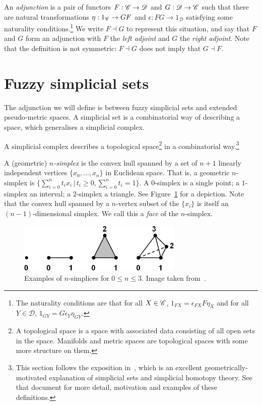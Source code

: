 \documentclass[a4paper,12pt,leqno]{article} \usepackage{amsmath}
\newcommand{\curD}{\mathscr{D}} \newcommand{\curI}{\mathscr{I}}
\theoremstyle{definition}
\begin{document}
An \emph{adjunction} is a pair of functors $F: \curC\to\curD$ and $G:
\curD\to\curC$ such that there are natural transformations $\eta: 1_{\mathscr{C}}\to GF$
and $\epsilon: FG\to 1_\curD$ satisfying some naturality conditions.\footnote{
  The naturality conditions are that for all $X\in\mathscr{C}$, $1_{FX}
  = \epsilon_{FX}F\eta_X$ and for all $Y\in\curD$, $1_{GY}
  = G\epsilon_Y\eta_{GY}$.} We write $F\dashv G$ to represent this situation,
and say that $F$ and $G$ form an adjunction with $F$ the \emph{left adjoint} and
$G$ the \emph{right adjoint}.
Note that the definition is not symmetric:
$F\dashv G$ does not imply that $G\dashv F$.

\section{Fuzzy simplicial sets}
\label{section_fss}

The adjunction we will define is between fuzzy simplicial sets and extended
pseudo-metric spaces.
A simplicial set is a combinatorial way of describing
a space, which generalises a simplicial complex.

A simplicial complex describes a topological space\footnote{ A topological space
is a space with associated data consisting of all open sets in the space.
Manifolds and metric spaces are topological spaces with some more structure on
them.} in a combinatorial way.\footnote{ This section follows the exposition
in~\cite{Friedman08}, which is an excellent geometrically-motivated explanation
of simplicial sets and simplicial homotopy theory.
See that document for more
detail, motivation and examples of these definitions.}

A (geometric) \emph{$n$-simplex} is the convex hull spanned by a set of $n+1$
linearly independent vertices $\{x_0,\dots, x_n\}$ in Euclidean space.
That is,
a geometric $n$-simplex is $\{\sum_{i=0}^n t_ix_i\,|\, t_i\geq 0, \sum_{i=0}^n
t_i = 1\}$.
A $0$-simplex is a single point; a $1$-simplex an interval;
a $2$-simplex a triangle.
See Figure~\ref{fig_simplices} for a depiction.
Note
that the convex hull spanned by a $n$-vertex subset of the $\{x_i\}$ is itself
an $(n-1)$-dimensional simplex.
We call this a \emph{face} of the $n$-simplex.

\begin{figure} \centering
\includegraphics[width=0.7\textwidth]{figures/simp2.jpg} \caption{Examples of
$n$-simplices for $0\leq n\leq 3$.
Image taken from~\cite{Friedman08}.}
\label{fig_simplices} \end{figure}
\end{document}

